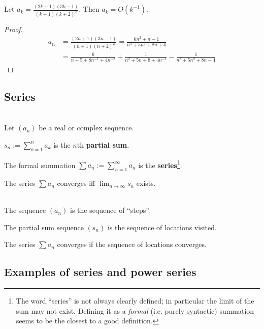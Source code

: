 \begin{claim*}
  Let $a_k = \frac{(2k+1)(3k-1)}{(k+1)(k+2)^2}$. Then $a_k = O(k^{-1})$.
\end{claim*}

\begin{proof}
  \begin{align*}
    a_n &= \frac{(2n+1)(3n-1)}{(n+1)(n+2)^2}
         = \frac{6n^2 + n - 1}{n^3 + 5n^2 + 8n + 4}\\
        &=
          \frac{6}{n + 5 + 8n^{-1} + 4n^{-2}} +
          \frac{1}{n^2 + 5n + 8 + 4n^{-1}} -
          \frac{1}{n^3 + 5n^2 + 8n + 4}
  \end{align*}
\end{proof}



\subsection{Series}
\begin{definition*}~\\
  Let $(a_n)$ be a real or complex sequence.

  $s_n := \sum_{k=1}^na_k$ is the $n$th {\bf partial sum}.

  The formal summation $\sum a_n := \sum_{n=1}^\infty a_n$ is the {\bf series}\footnote{The word
    ``series'' is not always clearly defined; in particular the limit of the sum may not
    exist. Defining it as a {\it formal} (i.e. purely syntactic) summation seems to be the closest
    to a good definition.}.

  The series $\sum a_n$ converges iff $\lim_{n \to \infty} s_n$ exists.
\end{definition*}

\begin{intuition*}~\\
  The sequence $(a_n)$ is the sequence of ``steps''.

  The partial sum sequence $(s_n)$ is the sequence of locations visited.

  The series $\sum a_n$ converges if the sequence of locations converges.
\end{intuition*}

\subsection{Examples of series and power series}

